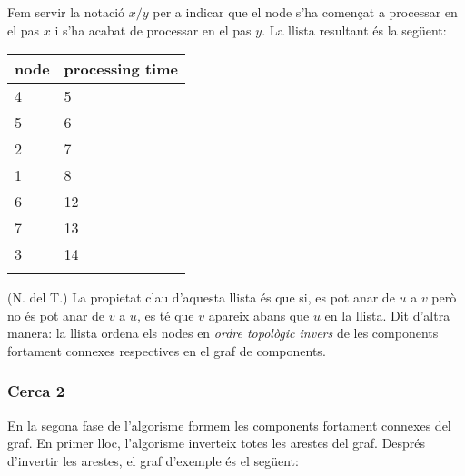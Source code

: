 Fem servir la notació $x/y$ per a indicar que el node s'ha començat a
processar en el pas $x$ i s'ha acabat de processar en el pas
$y$. La llista resultant és la següent:


\begin{tabular}{ll}
\\
node & processing time \\
\hline
4 & 5 \\
5 & 6 \\
2 & 7 \\
1 & 8 \\
6 & 12 \\
7 & 13 \\
3 & 14 \\
\\
\end{tabular}

(N. del T.) La propietat clau d'aquesta llista és que si, es pot anar
de $u$ a $v$ però no és pot anar de $v$ a $u$, es té que $v$ apareix
abans que $u$ en la llista. Dit d'altra manera: la llista ordena els
nodes en \emph{ordre topològic invers} de les components fortament
connexes respectives en el graf de components.

\subsubsection{Cerca 2}

En la segona fase de l'algorisme formem les components fortament
connexes del graf. En primer lloc, l'algorisme inverteix totes les
arestes del graf. Després d'invertir les arestes, el graf d'exemple és el següent:
\begin{center}
\end{center}


